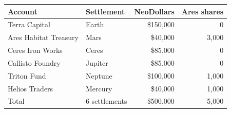 \par\noindent
\begin{tabular}{llrr}
\toprule
Account & Settlement & NeoDollars & Ares shares\\
\midrule
Terra Capital & Earth & \$150{,}000 & 0\\
Ares Habitat Treasury & Mars & \$40{,}000 & 3{,}000\\
Ceres Iron Works & Ceres & \$85{,}000 & 0\\
Callisto Foundry & Jupiter & \$85{,}000 & 0\\
Triton Fund & Neptune & \$100{,}000 & 1{,}000\\
Helios Traders & Mercury & \$40{,}000 & 1{,}000\\
\midrule Total & 6 settlements & \$500{,}000 & 5{,}000\\
\bottomrule
\end{tabular}\par
